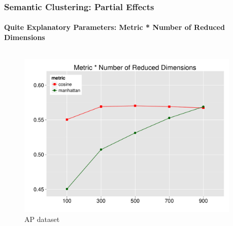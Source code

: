 \documentclass[t]{beamer} %
\begin{document}
\begin{frame}
\begin{columns}
\begin{column}{0.5\textwidth}
    \end{column}
  \end{columns}  
  
\end{frame}


\begin{frame}
  \frametitle{Semantic Clustering: Partial Effects}
  \framesubtitle{Quite Explanatory Parameters: Metric * Number of Reduced Dimensions}
  
  \vspace{-18pt}   

  \begin{columns}
    
    \begin{column}{0.5\textwidth}
      \begin{figure} 
        \hspace*{-18pt} 
        \includegraphics[scale=0.30]{img/lapesa_ap_main_metric_n-dim}
        \vspace{-10pt}
        \caption{AP dataset}
      \end{figure}
    \end{column}

    \begin{column}{0.5\textwidth}
      \centering
      

\end{column}
\end{columns}
\end{frame}
\end{document}

